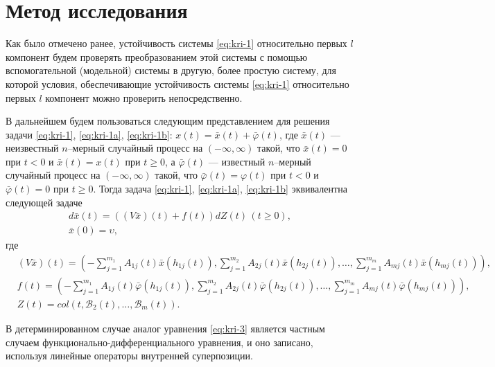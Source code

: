 \section{Метод исследования}\label{sec:kri-2}

Как было отмечено ранее,
устойчивость системы \eqref{eq:kri-1} относительно первых $l$ компонент будем
проверять преобразованием этой системы с помощью вспомогательной
(модельной) системы в другую, более простую систему, для которой
условия, обеспечивающие устойчивость системы \eqref{eq:kri-1} относительно первых
$l$ компонент можно проверить непосредственно.

В дальнейшем будем пользоваться следующим представлением для решения
задачи \eqref{eq:kri-1}, \eqref{eq:kri-1a}, \eqref{eq:kri-1b}: $x(t) = \bar x(t) + \bar \varphi (t)$, где
$\bar x(t)$ --- неизвестный $n$--мерный случайный процесс на
$(-\infty, \infty)$ такой, что $\bar x(t) = 0$ при $t < 0$ и $\bar
x(t) = x(t)$ при $t \geq 0$,  а $\bar  \varphi (t)$ --- известный
$n$--мерный случайный процесс на $(-\infty, \infty)$ такой, что
$\bar \varphi(t) = \varphi (t)$ при $t < 0$ и $\bar \varphi(t) = 0$
при $t \geq 0$.  Тогда  задача \eqref{eq:kri-1}, \eqref{eq:kri-1a}, \eqref{eq:kri-1b} эквивалентна
следующей задаче
\begin{gather}
    \label{eq:kri-3}
    d\bar x(t) =  ((V\bar x)(t) +f(t))dZ(t) {\,} (t \ge 0),
    \\
    \label{eq:kri-3b}
    \bar x(0) = \upsilon,  
\end{gather}
где
\begin{align*}
    &(V\bar x)(t)= \left(- \sum \limits_{j=1}^{m_1}A_{1j}(t)\bar
    x(h_{1j}(t)), \sum \limits_{j=1}^{m_2}A_{2j}(t)\bar x(h_{2j}(t)),
    \dots, \sum \limits_{j=1}^{m_m}A_{mj}(t)\bar x(h_{mj}(t))\right),
    \\
    &f(t)= \left(- \sum \limits_{j=1}^{m_1}A_{1j}(t)\bar
    \varphi(h_{1j}(t)), \sum \limits_{j=1}^{m_2}A_{2j}(t)\bar \varphi
    (h_{2j}(t)), \dots, \sum \limits_{j=1}^{m_m}A_{mj}(t)\bar \varphi
    (h_{mj}(t))\right),
    \\
    &Z(t)= col (t, \mathcal  B_2(t), \dots,\mathcal B_m(t)).
\end{align*}

\begin{remark}\label{rem:kri-1}
    В детерминированном случае аналог уравнения \eqref{eq:kri-3}
    является частным случаем функционально-дифференциального уравнения,
    и оно записано, используя линейные операторы внутренней
    суперпозиции.
\end{remark}

